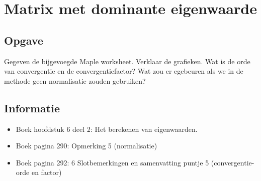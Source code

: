 \documentclass[examenvragen.tex]{subfiles}
\begin{document}
\section{Matrix met dominante eigenwaarde}
\subsection{Opgave}
Gegeven de bijgevoegde Maple worksheet. Verklaar de grafieken. Wat is de orde van convergentie en de convergentiefactor? Wat zou er egebeuren als we in de methode geen normalisatie zouden gebruiken?

\subsection{Informatie}
\begin{itemize}
\item Boek hoofdstuk 6 deel 2: Het berekenen van eigenwaarden.
\item Boek pagina 290: Opmerking 5 (normalisatie)
\item Boek pagina 292: 6 Slotbemerkingen en samenvatting puntje 5 (convergentie- orde en factor)
\end{itemize}
\end{document}
